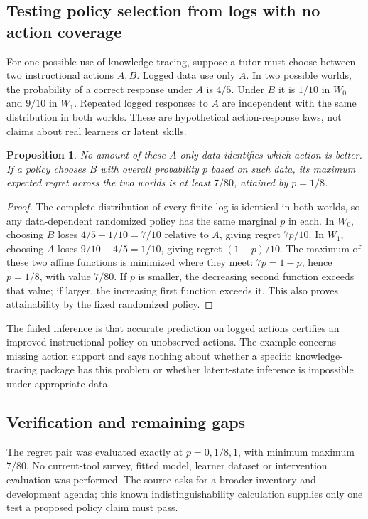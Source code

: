 \documentclass[11pt]{article}
\newtheorem{proposition}{Proposition}
\begin{document}
\subsection{Testing policy selection from logs with no action coverage}
For one possible use of knowledge tracing, suppose a tutor must choose between two instructional actions $A,B$. Logged data use only $A$. In two possible worlds, the probability of a correct response under $A$ is $4/5$. Under $B$ it is $1/10$ in $W_0$ and $9/10$ in $W_1$. Repeated logged responses to $A$ are independent with the same distribution in both worlds. These are hypothetical action-response laws, not claims about real learners or latent skills.
\begin{proposition}
No amount of these $A$-only data identifies which action is better. If a policy chooses $B$ with overall probability $p$ based on such data, its maximum expected regret across the two worlds is at least $7/80$, attained by $p=1/8$.
\end{proposition}
\begin{proof}
The complete distribution of every finite log is identical in both worlds, so any data-dependent randomized policy has the same marginal $p$ in each. In $W_0$, choosing $B$ loses $4/5-1/10=7/10$ relative to $A$, giving regret $7p/10$. In $W_1$, choosing $A$ loses $9/10-4/5=1/10$, giving regret $(1-p)/10$. The maximum of these two affine functions is minimized where they meet: $7p=1-p$, hence $p=1/8$, with value $7/80$. If $p$ is smaller, the decreasing second function exceeds that value; if larger, the increasing first function exceeds it. This also proves attainability by the fixed randomized policy.
\end{proof}
The failed inference is that accurate prediction on logged actions certifies an improved instructional policy on unobserved actions. The example concerns missing action support and says nothing about whether a specific knowledge-tracing package has this problem or whether latent-state inference is impossible under appropriate data.
\subsection{Verification and remaining gaps}
The regret pair was evaluated exactly at $p=0,1/8,1$, with minimum maximum $7/80$. No current-tool survey, fitted model, learner dataset or intervention evaluation was performed. The source asks for a broader inventory and development agenda; this known indistinguishability calculation supplies only one test a proposed policy claim must pass.
\end{document}
